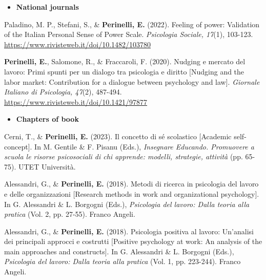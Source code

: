 \documentclass[hidelinks, letterpaper,10pt]{article} %
\begin{document}
\begin{itemize}
	\setlength{\topsep}{0pt}%
	\setlength{\leftmargin}{0.1in}%
	\setlength{\listparindent}{-0.1in}%
	\setlength{\itemindent}{-0.2in}%
	\setlength{\parsep}{\parskip}%
	
	\item {\textbf{\large{National journals}}}
\end{itemize}
\begin{etaremune}
	\item Paladino, M. P., Stefani, S., \& \textbf{Perinelli, E.} (2022). Feeling of power: Validation of the Italian Personal Sense of Power Scale. \textit{Psicologia Sociale, 17}(1), 103-123. \url{https://www.rivisteweb.it/doi/10.1482/103780}

	\item \textbf{Perinelli, E.}, Salomone, R., \& Fraccaroli, F. (2020). Nudging e mercato del lavoro: Primi spunti per un dialogo tra psicologia e diritto [Nudging and the labor market: Contribution for a dialogue between psychology and law]. \textit{Giornale Italiano di Psicologia, 47}(2), 487-494. \url{https://www.rivisteweb.it/doi/10.1421/97877}
\end{etaremune}
\vspace{3mm}

\begin{itemize}
	\setlength{\topsep}{0pt}%
	\setlength{\leftmargin}{0.1in}%
	\setlength{\listparindent}{-0.1in}%
	\setlength{\itemindent}{-0.2in}%
	\setlength{\parsep}{\parskip}%
	
	\item {\textbf{\large{Chapters of book}}}
\end{itemize}
\begin{etaremune}
    \item Cerni, T., \& \textbf{Perinelli, E.} (2023). Il concetto di sé scolastico [Academic self-concept]. In M. Gentile \& F. Pisanu (Eds.), \textit{Insegnare Educando. Promuovere a scuola le risorse psicosociali di chi apprende: modelli, strategie, attività} (pp. 65-75). UTET Università.

    
	\item Alessandri, G., \& \textbf{Perinelli, E.} (2018). Metodi di ricerca in psicologia del lavoro e delle organizzazioni [Research methods in work and organizational psychology]. In G. Alessandri \& L. Borgogni (Eds.), \textit{Psicologia del lavoro: Dalla teoria alla pratica} (Vol. 2, pp. 27-55). Franco Angeli.

    \item Alessandri, G., \& \textbf{Perinelli, E.} (2018). Psicologia positiva al lavoro: Un’analisi dei principali approcci e costrutti [Positive psychology at work: An analysis of the main approaches and constructs]. In G. Alessandri \& L. Borgogni (Eds.), \textit{Psicologia del lavoro: Dalla teoria alla pratica} (Vol. 1, pp. 223-244). Franco Angeli.
\end{etaremune}
\vspace{3mm}
\end{document}
